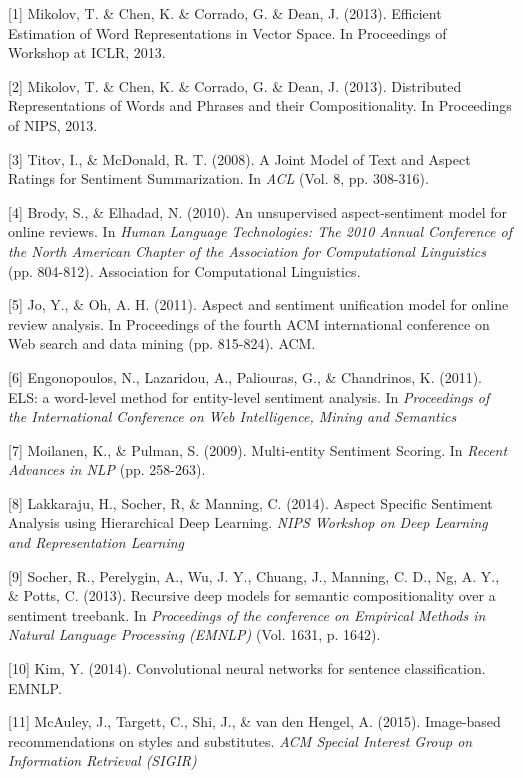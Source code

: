 \documentclass{article} %
\begin{document}
\small{

[1] Mikolov, T. \& Chen, K. \& Corrado, G. \& Dean, J. (2013). Efficient Estimation of Word Representations in Vector Space. In Proceedings of Workshop at ICLR, 2013.

[2] Mikolov, T. \& Chen, K. \& Corrado, G. \& Dean, J. (2013). Distributed Representations of Words and Phrases and their Compositionality. In Proceedings of NIPS, 2013.

[3] Titov, I., \& McDonald, R. T. (2008). A Joint Model of Text and Aspect Ratings for Sentiment Summarization. In {\it ACL} (Vol. 8, pp. 308-316).

[4] Brody, S., \& Elhadad, N. (2010). An unsupervised aspect-sentiment model for online reviews. In {\it Human Language Technologies: The 2010 Annual Conference of the North American Chapter of the Association for Computational Linguistics} (pp. 804-812). Association for Computational Linguistics.

[5] Jo, Y., \& Oh, A. H. (2011). Aspect and sentiment unification model for online review analysis. In Proceedings of the fourth ACM international conference on Web search and data mining (pp. 815-824). ACM.


[6] Engonopoulos, N., Lazaridou, A., Paliouras, G., \& Chandrinos, K. (2011). ELS: a word-level method for entity-level sentiment analysis. In {\it Proceedings of the International Conference on Web Intelligence, Mining and Semantics}


[7] Moilanen, K., \& Pulman, S. (2009). Multi-entity Sentiment Scoring. In {\it Recent Advances in NLP} (pp. 258-263).


[8] Lakkaraju, H., Socher, R, \& Manning, C. (2014). Aspect Specific Sentiment Analysis using Hierarchical Deep Learning. {\it NIPS Workshop on Deep Learning and Representation Learning}

[9] Socher, R., Perelygin, A., Wu, J. Y., Chuang, J., Manning, C. D., Ng, A. Y., \& Potts, C. (2013). Recursive deep models for semantic compositionality over a sentiment treebank. In {\it Proceedings of the conference on Empirical Methods in Natural Language Processing (EMNLP)} (Vol. 1631, p. 1642).

[10] Kim, Y. (2014). Convolutional neural networks for sentence classification. EMNLP.

[11] McAuley, J., Targett, C., Shi, J., \& van den Hengel, A. (2015). Image-based recommendations on styles and substitutes. {\it ACM Special Interest Group on Information Retrieval (SIGIR)}

}
\end{document}
